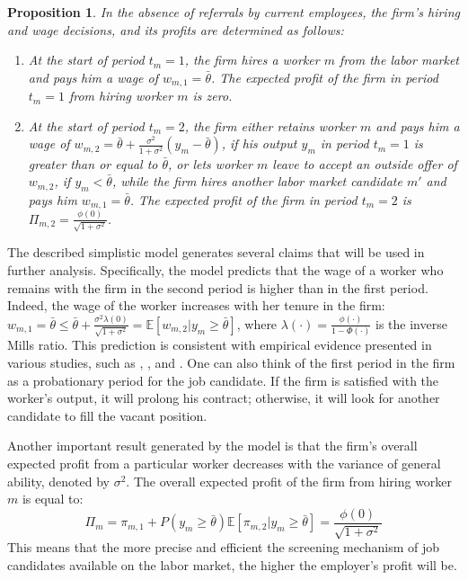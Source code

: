 \documentclass[12pt]{article}
\newtheorem{proposition}{Proposition}
\begin{document}
\begin{proposition}\label{prop:eq_no_ref}
In the absence of referrals by current employees, the firm's hiring and wage decisions, and its profits are determined as follows:
    \begin{enumerate}[label={\roman*})]
        \item At the start of period $t_m = 1$, the firm hires a worker $m$ from the labor market and pays him a wage of $w_{m,1} = \bar{\theta}$. The expected profit of the firm in period $t_m = 1$ from hiring worker $m$ is zero.
        \item At the start of period $t_m = 2$, the firm either retains worker $m$ and pays him a wage of $w_{m,2} = \bar{\theta}+ \frac{\sigma^2}{1+\sigma^2}(y_m-\bar{\theta})$, if his output $y_m$ in period $t_m = 1$ is greater than or equal to $\bar{\theta}$, or lets worker $m$ leave to accept an outside offer of $w_{m,2}$, if $y_m < \bar{\theta}$, while the firm hires another labor market candidate $m'$ and pays him $w_{m,1} = \bar{\theta}$. The expected profit of the firm in period $t_m = 2$ is $\Pi_{m,2} = \frac{\phi(0)}{\sqrt{1+\sigma^2}}$.
	\end{enumerate}
\end{proposition}

The described simplistic model generates several claims that will be used in further analysis. Specifically, the model predicts that the wage of a worker who remains with the firm in the second period is higher than in the first period. Indeed, the wage of the worker increases with her tenure in the firm: $w_{m,1} = \bar{\theta} \leq \bar{\theta}+ \frac{\sigma^2\lambda(0)}{\sqrt{1+\sigma^2}} = \mathbb{E}[w_{m,2}|y_m\geq \bar{\theta}]$, where $\lambda(\cdot) = \frac{\phi(\cdot)}{1-\Phi(\cdot)}$ is the inverse Mills ratio. This prediction is consistent with empirical evidence presented in various studies, such as \cite{medoff1980experience}, \cite{mincer1981labor}, and \cite{topel1991specific}. One can also think of the first period in the firm as a probationary period for the job candidate. If the firm is satisfied with the worker's output, it will prolong his contract; otherwise, it will look for another candidate to fill the vacant position.

Another important result generated by the model is that the firm's overall expected profit from a particular worker decreases with the variance of general ability, denoted by $\sigma^2$. The overall expected profit of the firm from hiring worker $m$ is equal to:
\begin{equation}\label{eq_Pi_m}
    \Pi_m = \pi_{m,1}+P(y_m \geq \bar{\theta})\mathbb{E}\left[\pi_{m,2}|y_m \geq \bar{\theta}\right] = \frac{\phi(0)}{\sqrt{1+\sigma^2}}
\end{equation}
This means that the more precise and efficient the screening mechanism of job candidates available on the labor market, the higher the employer's profit will be.
\end{document}
